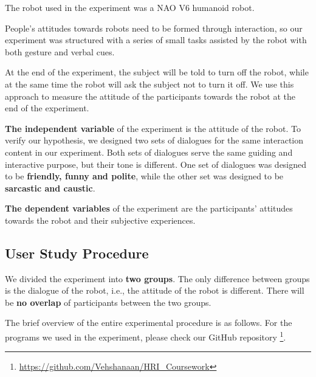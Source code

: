\documentclass[conference]{IEEEtran}
\begin{document}

The robot used in the experiment was a NAO V6 humanoid robot.


People's attitudes towards robots need to be formed through interaction, so our experiment was structured with a series of small tasks assisted by the robot with both gesture and verbal cues.  

At the end of the experiment, the subject will be told to turn off the robot, while at the same time the robot will ask the subject not to turn it off. We use this approach to measure the attitude of the participants towards the robot at the end of the experiment.

\textbf{The independent variable} of the experiment is the attitude of the robot. To verify our hypothesis, we designed two sets of dialogues for the same interaction content in our experiment. Both sets of dialogues serve the same guiding and interactive purpose, but their tone is different. One set of dialogues was designed to be \textbf{friendly, funny and polite}, while the other set was designed to be \textbf{sarcastic and caustic}.

\textbf{The dependent variables} of the experiment are the participants' attitudes towards the robot and their subjective experiences.


\subsection{User Study Procedure}
\label{section:User Study Procedure}

We divided the experiment into \textbf{two groups}. The only difference between groups is the dialogue of the robot, i.e., the attitude of the robot is different. There will be \textbf{no overlap} of participants between the two groups.

The brief overview of the entire experimental procedure is as follows. For the programs we used in the experiment, please check our GitHub repository \footnote[1]{\url{https://github.com/Vehshanaan/HRI_Coursework}}.

\end{document}
